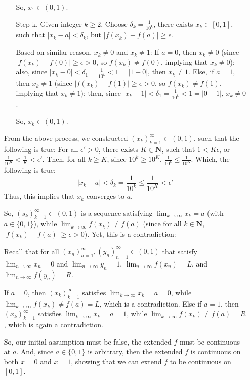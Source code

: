 \documentclass{article}
\begin{document}
\begin{itemize}
\begin{itemize}
        So, $x_1 \in (0,1)$.

        \item[Step k.] Given integer $k\geq 2$, Choose $\delta_k = \frac{1}{10^k}$, there exists $x_k \in [0,1]$, such that $|x_k-a| < \delta_k$, but $|f(x_k)-f(a)| \geq \epsilon$. 

        Based on similar reason, $x_k \neq 0$ and $x_k \neq 1$: If $a = 0$, then $x_k \neq 0$ (since $|f(x_k)-f(0)| \geq \epsilon > 0$, so $f(x_k) \neq f(0)$, implying that $x_k \neq 0$); also, since $|x_k-0| < \delta_1 = \frac{1}{10^k} < 1 = |1-0|$, then $x_k \neq 1$. Else, if $a=1$, then $x_k \neq 1$ (since $|f(x_k)-f(1)| \geq \epsilon > 0$, so $f(x_k) \neq f(1)$, implying that $x_k \neq 1$); then, since $|x_k-1| < \delta_1 = \frac{1}{10^k} < 1 = |0-1|$, $x_k \neq 0$.

        So, $x_k \in (0,1)$.
    \end{itemize}
    From the above process, we constructed $(x_k)_{k=1}^{\infty} \subset (0,1)$, such that the following is true: For all $\epsilon' >0$, there exists $K\in\mathbf{N}$, such that $1<K\epsilon$, or $\frac{1}{10^K} <\frac{1}{K} < \epsilon'$. Then, for all $k \geq K$, since $10^k \geq 10^K$, $\frac{1}{10^k} \leq \frac{1}{10^K}$. Which, the following is true:
    $$|x_k-a| < \delta_k = \frac{1}{10^k} \leq \frac{1}{10^K} < \epsilon'$$
    Thus, this implies that $x_k$ converges to $a$. 
    
    So, $(s_k)_{k=1}^{\infty} \subset (0,1)$ is a sequence satisfying $\lim_{k\rightarrow \infty}x_k = a$ (with $a \in \{0,1\}$), while $\lim_{k\rightarrow \infty}f(x_k) \neq f(a)$ (since for all $k\in\mathbf{N}$, $|f(x_k)-f(a)| \geq \epsilon >0$). Yet, this is a contradiction:

    Recall that for all $(x_n)_{n=1}^{\infty}, (y_n)_{n=1}^{\infty} \in (0,1)$ that satisfy $\lim_{n\rightarrow\infty}x_n = 0$ and $\lim_{n\rightarrow\infty}y_n = 1$, $\lim_{n\rightarrow \infty}f(x_n) = L$, and $\lim_{n\rightarrow \infty}f(y_n) = R$.

    If $a=0$, then $(x_k)_{k=1}^{\infty}$ satisfies $\lim_{k\rightarrow \infty}x_k = a = 0$, while $\lim_{k\rightarrow \infty}f(x_k) \neq f(a) = L$, which is a contradiction. Else if $a=1$, then $(x_k)_{k=1}^{\infty}$ satisfies $\lim_{k\rightarrow \infty}x_k = a = 1$, while $\lim_{k\rightarrow \infty}f(x_k) \neq f(a) = R$, which is again a contradiction.

    So, our initial assumption must be false, the extended $f$ must be continuous at $a$. And, since $a\in\{0,1\}$ is arbitrary, then the extended $f$ is continuous on both $x=0$ and $x=1$, showing that we can extend $f$ to be continuous on $[0,1]$.
\end{itemize}
\end{document}
